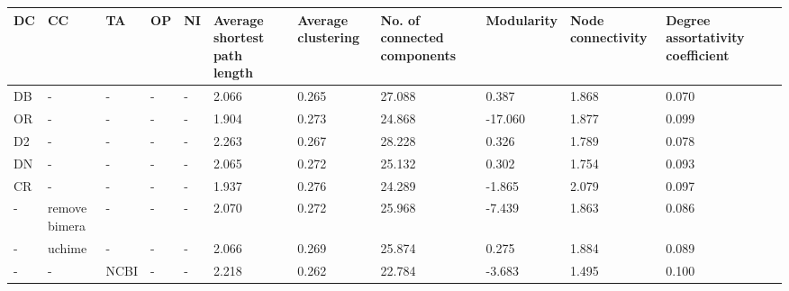   \begin{landscape}
  \begin{table}[H]
    \centering
    \small
    \begin{tabular}{|l|p{1cm}|p{1cm}|p{1cm}|p{2cm}|p{1.5cm}|p{1.5cm}|p{1.5cm}|p{1.5cm}|p{1.5cm}|p{1.5cm}|p{1.5cm}|}
  \hline
  DC & CC            & TA                & OP          & NI         & Average shortest path length & Average clustering & No. of connected components & Modularity & Node connectivity & Degree assortativity coefficient \\ \hline
  DB & -             & -                 & -           & -          & 2.066                        & 0.265              & 27.088                      & 0.387      & 1.868             & 0.070                            \\
  OR & -             & -                 & -           & -          & 1.904                        & 0.273              & 24.868                      & -17.060    & 1.877             & 0.099                            \\
  D2 & -             & -                 & -           & -          & 2.263                        & 0.267              & 28.228                      & 0.326      & 1.789             & 0.078                            \\
  DN & -             & -                 & -           & -          & 2.065                        & 0.272              & 25.132                      & 0.302      & 1.754             & 0.093                            \\
  CR & -             & -                 & -           & -          & 1.937                        & 0.276              & 24.289                      & -1.865     & 2.079             & 0.097                            \\
  -  & remove bimera & -                 & -           & -          & 2.070                        & 0.272              & 25.968                      & -7.439     & 1.863             & 0.086                            \\
  -  & uchime        & -                 & -           & -          & 2.066                        & 0.269              & 25.874                      & 0.275      & 1.884             & 0.089                            \\
  -  & -             & NCBI              & -           & -          & 2.218                        & 0.262              & 22.784                      & -3.683     & 1.495             & 0.100                            \\

\end{tabular}
\end{table}
\end{landscape}
